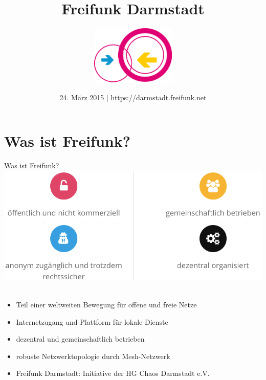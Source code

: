 \documentclass{beamer}
\title{Freifunk Darmstadt}
\author{\includegraphics[width=4cm]{images/logo}}
\date{24. März 2015 | https://darmstadt.freifunk.net}
\begin{document}
\begin{frame}
\maketitle
\end{frame}



\section{Was ist Freifunk?}
\begin{frame}{Was ist Freifunk?}
\includegraphics[width=1.1\textheight]{images/principles}$\;$
\begin{itemize}
	\item Teil einer weltweiten Bewegung für offene und freie Netze
	\item Internetzugang und Plattform für lokale Dienste
	\item dezentral und gemeinschaftlich betrieben
	\item robuste Netzwerktopologie durch Mesh-Netzwerk
	\item Freifunk Darmstadt: Initiative der HG Chaos Darmstadt e.V.
\end{itemize}
\end{frame}
\end{document}
